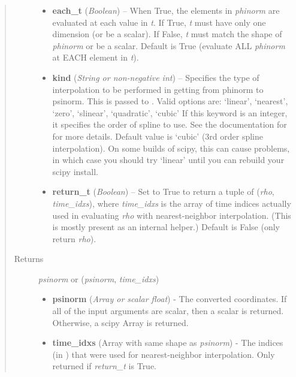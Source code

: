\documentclass[letterpaper,10pt,english]{sphinxmanual}
\begin{document}
\begin{fulllineitems}
\begin{fulllineitems}
\begin{quote}
\begin{description}
\begin{itemize}
\item {} 
\textbf{each\_t} (\emph{Boolean}) --
When True, the elements in \emph{phinorm} are evaluated
at each value in \emph{t}. If True, \emph{t} must have only one dimension
(or be a scalar). If False, \emph{t} must match the shape of \emph{phinorm}
or be a scalar. Default is True (evaluate ALL \emph{phinorm} at EACH
element in \emph{t}).

\item {} 
\textbf{kind} (\emph{String or non-negative int}) --
Specifies the type of
interpolation to be performed in getting from phinorm to
psinorm. This is passed to
. Valid options are:
`linear', `nearest', `zero', `slinear', `quadratic', `cubic'
If this keyword is an integer, it specifies the order of spline
to use. See the documentation for  for more
details. Default value is `cubic' (3rd order spline
interpolation). On some builds of scipy, this can cause problems,
in which case you should try `linear' until you can rebuild your
scipy install.

\item {} 
\textbf{return\_t} (\emph{Boolean}) --
Set to True to return a tuple of (\emph{rho},
\emph{time\_idxs}), where \emph{time\_idxs} is the array of time indices
actually used in evaluating \emph{rho} with nearest-neighbor
interpolation. (This is mostly present as an internal helper.)
Default is False (only return \emph{rho}).

\end{itemize}

\item[{Returns}] \leavevmode

\emph{psinorm} or (\emph{psinorm}, \emph{time\_idxs})
\begin{itemize}
\item {} 
\textbf{psinorm} (\emph{Array or scalar float}) - The converted coordinates. If
all of the input arguments are scalar, then a scalar is returned.
Otherwise, a scipy Array is returned.

\item {} 
\textbf{time\_idxs} (Array with same shape as \emph{psinorm}) - The indices
(in ) that were used for
nearest-neighbor interpolation. Only returned if \emph{return\_t} is
True.

\end{itemize}


\end{description}\end{quote}

\end{fulllineitems}
\end{fulllineitems}
\end{document}
